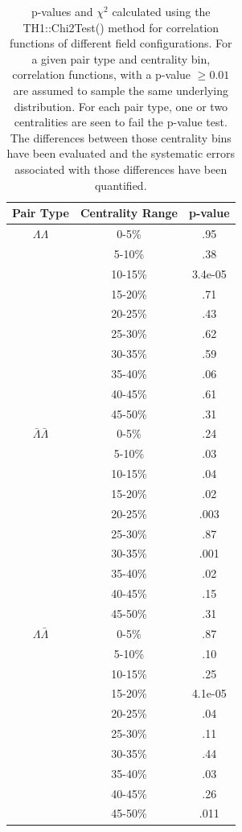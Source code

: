 \begin{table}
\begin{center}
\begin{tabular}{| c | c | c |}
  \hline                       
  Pair Type & Centrality Range & p-value \\
  \hline
  $\Lambda\Lambda$ & 0-5\% & .95  \\
   & 5-10\%  & .38 \\
   & 10-15\% & 3.4e-05 \\
   & 15-20\% & .71 \\
   & 20-25\% & .43 \\
   & 25-30\% & .62 \\
   & 30-35\% & .59 \\
   & 35-40\% & .06 \\
   & 40-45\% & .61 \\
   & 45-50\% & .31 \\
   \hline
  $\bar{\Lambda}\bar{\Lambda}$ &  0-5\% & .24 \\
   & 5-10\% & .03 \\
   & 10-15\% & .04 \\
   & 15-20\% & .02 \\
   & 20-25\% & .003 \\
   & 25-30\% & .87 \\
   & 30-35\% & .001 \\
   & 35-40\% & .02 \\
   & 40-45\% & .15 \\
   & 45-50\% & .31 \\
   \hline
  $\Lambda\bar{\Lambda}$ &  0-5\% & .87 \\
   & 5-10\% & .10 \\
   & 10-15\% & .25 \\
   & 15-20\% & 4.1e-05 \\
   & 20-25\% & .04 \\
   & 25-30\% & .11 \\
   & 30-35\% & .44 \\
   & 35-40\% & .03 \\
   & 40-45\% & .26 \\
   & 45-50\% & .011 \\
  \hline  
\end{tabular}
\label{tab:FieldPvalues}
\caption{p-values and $\chi^2$ calculated using the TH1::Chi2Test() method for correlation functions of different field configurations.  For a given pair type and centrality bin, correlation functions, with a p-value $\geq 0.01$ are assumed to sample the same underlying distribution.  For each pair type, one or two centralities are seen to fail the p-value test.  The differences between those centrality bins have been evaluated and the systematic errors associated with those differences have been quantified.}
\end{center}
\end{table}



